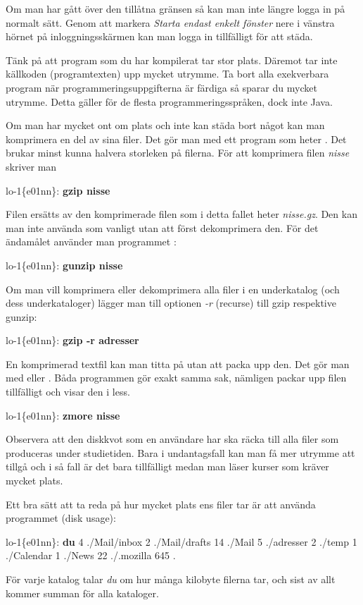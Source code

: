 \documentclass[a4paper,twocolumn]{book}
\begin{document}
Om man har gått över den tillåtna gränsen så kan man inte längre logga
in på normalt sätt. Genom att markera \emph{Starta
  endast enkelt fönster} nere i vänstra hörnet på inloggningsskärmen
kan man logga in tillfälligt för att städa.

Tänk på att program som du har kompilerat tar stor plats. Däremot tar
inte källkoden (programtexten) upp mycket utrymme. Ta bort alla
exekverbara program när programmeringsuppgifterna är färdiga så sparar
du mycket utrymme. Detta gäller för de flesta programmeringsspråken,
dock inte Java.

Om man har mycket ont om plats och inte kan städa bort något kan man
komprimera en del av
sina filer. Det gör man med ett program som heter . Det
brukar minst kunna halvera storleken på filerna. För att komprimera
filen \emph{nisse} skriver man
\begin{example}
lo-1\{e01nn\}: \textbf{gzip nisse}
\end{example}
Filen ersätts av den komprimerade filen som i detta fallet heter
\emph{nisse.gz}. Den kan man inte använda som vanligt utan att först
dekomprimera den. För det ändamålet använder man programmet
:
\begin{example}
lo-1\{e01nn\}: \textbf{gunzip nisse}
\end{example}
Om man vill komprimera eller dekomprimera alla filer i en underkatalog
(och dess underkataloger) lägger man till optionen \emph{-r} (recurse)
till gzip respektive gunzip:
\begin{example}
lo-1\{e01nn\}: \textbf{gzip -r adresser}
\end{example}
En komprimerad textfil kan man titta på utan att packa upp den. Det
gör man med  eller . Båda programmen gör
exakt samma sak, nämligen packar upp filen tillfälligt och visar den i
less.
\begin{example}
lo-1\{e01nn\}: \textbf{zmore nisse}
\end{example}

Observera att den diskkvot som en användare har ska räcka till alla
filer som produceras under studietiden. Bara i undantagsfall kan man
få mer utrymme att tillgå och i så fall är det bara tillfälligt medan
man läser kurser som kräver mycket plats.

Ett bra sätt att ta reda på hur mycket plats ens filer tar är att
använda programmet  (disk usage):
\begin{example}
lo-1\{e01nn\}: \textbf{du}
4       ./Mail/inbox
2       ./Mail/drafts
14      ./Mail
5       ./adresser
2       ./temp
1       ./Calendar
1       ./News
22      ./.mozilla
645     .
\end{example}
För varje katalog talar \emph{du} om hur många kilobyte filerna tar,
och sist av allt kommer summan för alla kataloger.
\end{document}
